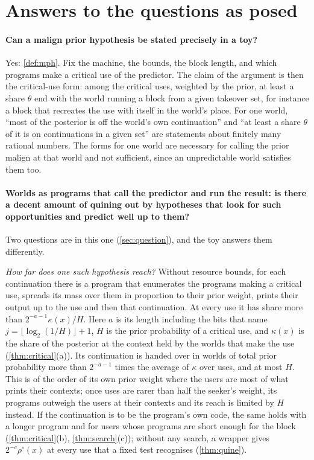 \section{Answers to the questions as posed}\label{sec:answers}

\paragraph{Can a malign prior hypothesis be stated precisely in a toy?} Yes: \cref{def:mph}. Fix the machine,
the bounds, the block length, and which programs make a critical use of the predictor. The claim of the
argument is then the critical-use form: among the critical uses, weighted by the prior, at least a share
$\theta$ end with the world running a block from a given takeover set, for instance a block that recreates the
use with itself in the world's place. For one world, ``most of the posterior is off the world's own
continuation'' and ``at least a share $\theta$ of it is on continuations in a given set'' are statements about
finitely many rational numbers. The forms for one world are necessary for calling the prior malign at that
world and not sufficient, since an unpredictable world satisfies them too.

\paragraph{Worlds as programs that call the predictor and run the result: is there a decent amount of quining
out by hypotheses that look for such opportunities and predict well up to them?} Two questions are in this
one (\cref{sec:question}), and the toy answers them differently.

\emph{How far does one such hypothesis reach?} Without resource bounds, for each continuation there is a
program that enumerates the programs making a critical use, spreads its mass over them in proportion to their
prior weight, prints their output up to the use and then that continuation. At every use it has share more
than $2^{-a-1}\kappa(x)/H$. Here $a$ is its length including the bits that name
$j=\lfloor\log_2(1/H)\rfloor+1$, $H$ is the prior probability of a critical use, and $\kappa(x)$ is the share
of the posterior at the context held by the worlds that make the use (\cref{thm:critical}(a)). Its
continuation is handed over in worlds of total prior probability more than $2^{-a-1}$ times the average of
$\kappa$ over uses, and at most $H$. This is of the order of its own prior weight where the users are most of
what prints their contexts; once uses are rarer than half the seeker's weight, its programs outweigh the users
at their contexts and its reach is limited by $H$ instead. If the continuation is to be the program's own
code, the same holds with a longer program and for users whose programs are short enough for the block
(\cref{thm:critical}(b), \cref{thm:search}(c)); without any search, a wrapper gives $2^{-c}\rho^\circ(x)$ at
every use that a fixed test recognises (\cref{thm:quine}).

